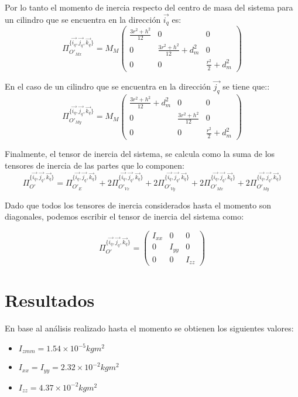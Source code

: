 \documentclass[main]{subfiles}
\begin{document}
Por lo tanto el momento de inercia respecto del centro de masa del sistema para un cilindro que se encuentra en la dirección $\vec{i_q}$ es:
$$
\Pi_{O\prime_{Mx}}^{\{\vec{i_q}, \vec{j_q}, \vec{k_q}\}}=M_M\left(\begin{array}{ccc}
\frac{3r^2+h^2}{12}  &0&  0\\
0  &\frac{3r^2+h^2}{12} +d_m^2& 0\\
0  &0 & \frac{r^2}{2}+d_m^2  
\end{array}\right)
$$


En el caso de un cilindro que se encuentra en la dirección $\vec{j_q}$ se tiene que::
$$
\Pi_{O\prime_{My}}^{\{\vec{i_q}, \vec{j_q}, \vec{k_q}\}}=M_M\left(\begin{array}{ccc}
\frac{3r^2+h^2}{12} +d_m^2 &0&  0\\
0  &\frac{3r^2+h^2}{12} & 0\\
0  &0 & \frac{r^2}{2}+d_m^2  
\end{array}\right)
$$


Finalmente, el tensor de inercia del sistema, se calcula como la suma de los tensores de inercia de las partes que lo componen:
$$\Pi_{O\prime}^{\{\vec{i_q}, \vec{j_q}, \vec{k_q}\}} =\Pi_{O\prime_E}^{\{\vec{i_q}, \vec{j_q}, \vec{k_q}\}} + 2 \Pi_{O\prime_{Vx}}^{\{\vec{i_q}, \vec{j_q}, \vec{k_q}\}} + 2 \Pi_{O\prime_{Vy}}^{\{\vec{i_q}, \vec{j_q}, \vec{k_q}\}} + 2 \Pi_{O\prime_{Mx}}^{\{\vec{i_q}, \vec{j_q}, \vec{k_q}\}}+ 2 \Pi_{O\prime_{My}}^{\{\vec{i_q}, \vec{j_q}, \vec{k_q}\}}$$

Dado que todos los tensores de inercia considerados hasta el momento son diagonales, podemos escribir el tensor de inercia del sistema como:

$$\Pi_{O\prime}^{\{\vec{i_q}, \vec{j_q}, \vec{k_q}\}}=\left(\begin{array}{ccc}
I_{xx}  &0&  0\\
0  &I_{yy}& 0\\
0  &0 & I_{zz}  
\end{array}\right)$$

\section{Resultados} 

En base al análisis realizado hasta el momento se obtienen los siguientes valores:

\begin{itemize}
\item $I_{zmm}=1.54\times10^{-5}kgm^2$
\item $I_{xx}=I_{yy}=2.32\times10^{-2}kgm^2$
\item $I_{zz}=4.37\times10^{-2}kgm^2$
\end{itemize}
\end{document}
